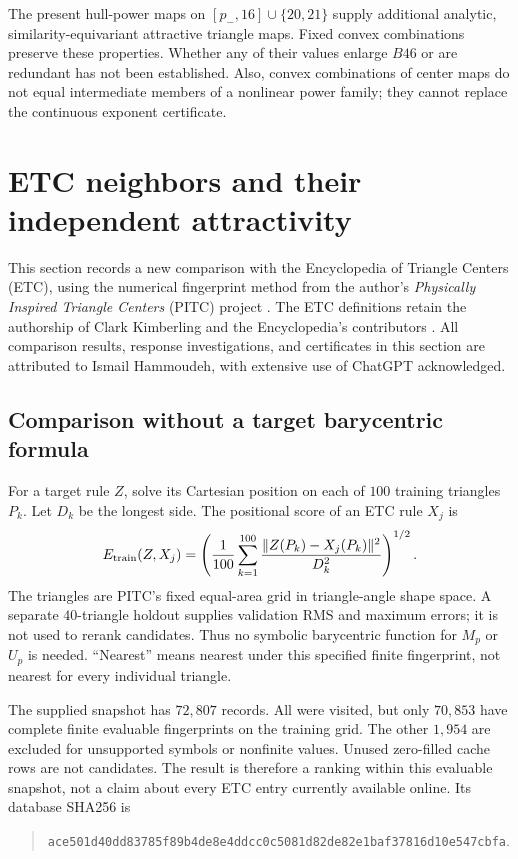 \documentclass[11pt]{article}
\theoremstyle{definition}
\newcommand{\pn}{p_{-}}
\newcommand{\pathcode}[1]{\nolinkurl{#1}}
\begin{document}
The present hull-power maps on $[\pn,16]\cup\{20,21\}$ supply additional analytic,
similarity-equivariant attractive triangle maps. Fixed convex combinations
preserve these properties. Whether any of their values enlarge $B46$ or
are redundant has not been established. Also, convex combinations of
center maps do not equal intermediate members of a nonlinear power family;
they cannot replace the continuous exponent certificate.

\section{ETC neighbors and their independent attractivity}\label{sec:neighbors}
This section records a new comparison with the Encyclopedia of Triangle
Centers (ETC), using the numerical fingerprint method from the author's
\emph{Physically Inspired Triangle Centers} (PITC) project
\cite{PITC,Neighbors}. The ETC definitions retain the authorship of Clark
Kimberling and the Encyclopedia's contributors \cite{ETC}. All comparison
results, response investigations, and certificates in this section are
attributed to Ismail Hammoudeh, with extensive use of ChatGPT acknowledged.

\subsection{Comparison without a target barycentric formula}
For a target rule $Z$, solve its Cartesian position on each of $100$
training triangles $P_k$. Let $D_k$ be the longest side. The positional score
of an ETC rule $X_j$ is
\begin{equation}\label{eq:etc-rms}
 E_{\rm train}(Z,X_j)=\left(\frac1{100}\sum_{k=1}^{100}
 \frac{\|Z(P_k)-X_j(P_k)\|^2}{D_k^2}\right)^{1/2}.
\end{equation}
The triangles are PITC's fixed equal-area grid in triangle-angle shape
space. A separate $40$-triangle holdout supplies validation RMS and maximum
errors; it is not used to rerank candidates. Thus no symbolic barycentric
function for $M_p$ or $U_p$ is needed. ``Nearest'' means nearest under this
specified finite fingerprint, not nearest for every individual triangle.

The supplied snapshot has $72{,}807$ records. All were visited, but only
$70{,}853$ have complete finite evaluable fingerprints on the training
grid. The other $1{,}954$ are excluded for unsupported symbols or
nonfinite values. Unused zero-filled cache rows are not candidates.
The result is therefore a ranking within this evaluable snapshot, not a
claim about every ETC entry currently available online. Its database
SHA256 is
\begin{quote}\footnotesize
\pathcode{ace501d40dd83785f89b4de8e4ddcc0c5081d82de82e1baf37816d10e547cbfa}.
\end{quote}
\end{document}
